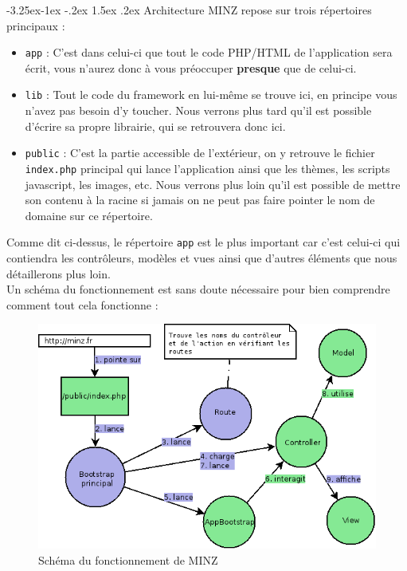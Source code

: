 \documentclass[a4paper,11pt]{article}
\makeatletter
\renewcommand{\subsection}{\@startsection{subsection}{2}{\z@}%
             {-3.25ex\@plus -1ex \@minus -.2ex}%
             {1.5ex \@plus .2ex}%
             {\color{bleuFonce}\normalfont\large\bfseries}}
\makeatother
\begin{document}
\subsection{Architecture}
MINZ repose sur trois répertoires principaux :
\begin{itemize}
  \item \texttt{app} : C'est dans celui-ci que tout le code PHP/HTML de l'application sera écrit, vous n'aurez donc à vous préoccuper \textbf{presque} que de celui-ci.
  \item \texttt{lib} : Tout le code du framework en lui-même se trouve ici, en principe vous n'avez pas besoin d'y toucher. Nous verrons plus tard qu'il est possible d'écrire sa propre librairie, qui se retrouvera donc ici.
  \item \texttt{public} : C'est la partie accessible de l'extérieur, on y retrouve le fichier \texttt{index.php} principal qui lance l'application ainsi que les thèmes, les scripts javascript, les images, etc. Nous verrons plus loin qu'il est possible de mettre son contenu à la racine si jamais on ne peut pas faire pointer le nom de domaine sur ce répertoire.
\end{itemize}

Comme dit ci-dessus, le répertoire \texttt{app} est le plus important car c'est celui-ci qui contiendra les contrôleurs, modèles et vues ainsi que d'autres éléments que nous détaillerons plus loin.\\

Un schéma du fonctionnement est sans doute nécessaire pour bien comprendre comment tout cela fonctionne :
\begin{figure}[h]
  \centering
  \includegraphics[width=13cm]{schemaFonctionnement.png}
  \caption{Schéma du fonctionnement de MINZ}
  \label{fig1}
\end{figure}
\end{document}
